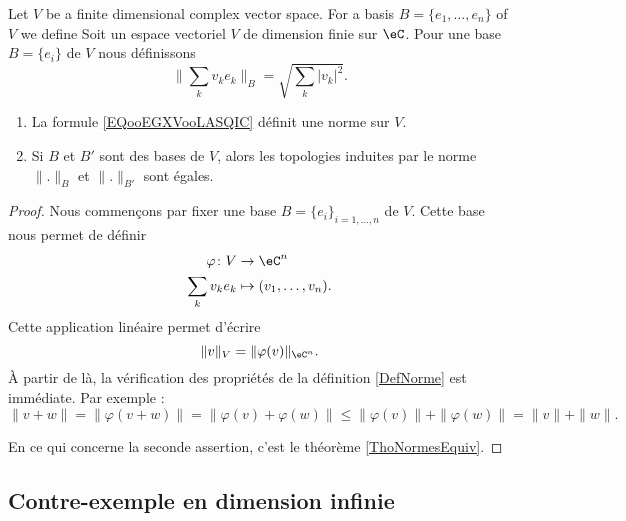 \begin{proposition} \label{PROPooNTCFooEcwZwt}
    Let \( V\) be a finite dimensional complex vector space. For a basis \( B=\{ e_1,\ldots, e_n \}\) of \( V\) we define
    Soit un espace vectoriel \( V\) de dimension finie sur \( \eC\). Pour une base \( B= \{ e_i \}\) de \( V\) nous définissons
    \begin{equation}        \label{EQooEGXVooLASQIC}
        \| \sum_kv_ke_k \|_B= \sqrt{ \sum_k| v_k |^2 }.
    \end{equation}
    \begin{enumerate}
        \item
            La formule \eqref{EQooEGXVooLASQIC} définit une norme sur \( V\).
        \item
            Si \( B\) et \( B'\) sont des bases de \( V\), alors les topologies induites par le norme \( \| . \|_B\) et \( \| . \|_{B'}\) sont égales.
    \end{enumerate}
\end{proposition}

\begin{proof}
    Nous commençons par fixer une base \( B=\{ e_i \}_{i=1,\ldots, n}\) de \( V\). Cette base nous permet de définir
    \begin{equation}
        \begin{aligned}
            \varphi\colon V&\to \eC^n \\
            \sum_kv_ke_k&\mapsto (v_1,\ldots, v_n). 
        \end{aligned}
    \end{equation}
    Cette application linéaire permet d'écrire
    \begin{equation}
        \| v \|_V=\| \varphi(v) \|_{\eC^n}.
    \end{equation}
    À partir de là, la vérification des propriétés de la définition \ref{DefNorme} est immédiate. Par exemple :
    \begin{equation}
        \| v+w \|=\| \varphi(v+w) \|=\| \varphi(v)+\varphi(w) \|\leq \| \varphi(v) \|+\| \varphi(w) \|=\| v \|+\| w \|.
    \end{equation}

    En ce qui concerne la seconde assertion, c'est le théorème \ref{ThoNormesEquiv}.
\end{proof}

\subsection{Contre-exemple en dimension infinie}
\label{SubSecPOlynomesCE}

